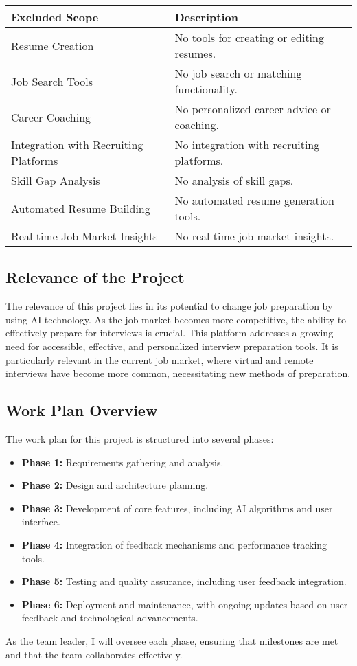 \begin{tabular}{|l|l|}
    \hline
    \textbf{Excluded Scope} & \textbf{Description} \\
    \hline
    Resume Creation & No tools for creating or editing resumes. \\
    \hline
    Job Search Tools & No job search or matching functionality. \\
    \hline
    Career Coaching & No personalized career advice or coaching. \\
    \hline
    Integration with Recruiting Platforms & No integration with recruiting platforms. \\
    \hline
    Skill Gap Analysis & No analysis of skill gaps. \\
    \hline
    Automated Resume Building & No automated resume generation tools. \\
    \hline
    Real-time Job Market Insights & No real-time job market insights. \\
    \hline
    \end{tabular}


\subsection{Relevance of the Project}
The relevance of this project lies in its potential to change job preparation by using AI technology. As the job market becomes more competitive, the ability to effectively prepare for interviews is crucial. This platform addresses a growing need for accessible, effective, and personalized interview preparation tools. It is particularly relevant in the current job market, where virtual and remote interviews have become more common, necessitating new methods of preparation.

\subsection{Work Plan Overview}
The work plan for this project is structured into several phases:
\begin{itemize}
    \item \textbf{Phase 1:} Requirements gathering and analysis.
    \item \textbf{Phase 2:} Design and architecture planning.
    \item \textbf{Phase 3:} Development of core features, including AI algorithms and user interface.
    \item \textbf{Phase 4:} Integration of feedback mechanisms and performance tracking tools.
    \item \textbf{Phase 5:} Testing and quality assurance, including user feedback integration.
    \item \textbf{Phase 6:} Deployment and maintenance, with ongoing updates based on user feedback and technological advancements.
\end{itemize}
As the team leader, I will oversee each phase, ensuring that milestones are met and that the team collaborates effectively.

